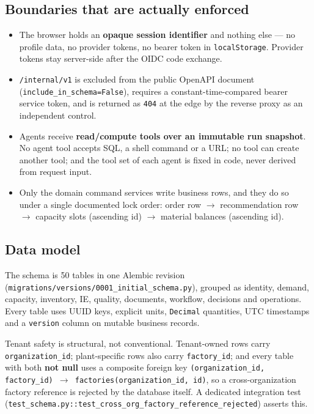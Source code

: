 \documentclass[11pt,a4paper]{article}
\begin{document}
\clearpage
\subsection{Boundaries that are actually enforced}

\begin{itemize}
\item The browser holds an \textbf{opaque session identifier} and nothing else
  --- no profile data, no provider tokens, no bearer token in
  \texttt{localStorage}. Provider tokens stay server-side after the OIDC code
  exchange.
\item \texttt{/internal/v1} is excluded from the public OpenAPI document
  (\texttt{include\_in\_schema=False}), requires a constant-time-compared bearer
  service token, and is returned as \texttt{404} at the edge by the reverse
  proxy as an independent control.
\item Agents receive \textbf{read/compute tools over an immutable run snapshot}.
  No agent tool accepts SQL, a shell command or a URL; no tool can create
  another tool; and the tool set of each agent is fixed in code, never derived
  from request input.
\item Only the domain command services write business rows, and they do so under
  a single documented lock order: order row $\rightarrow$ recommendation row
  $\rightarrow$ capacity slots (ascending id) $\rightarrow$ material balances
  (ascending id).
\end{itemize}

\subsection{Data model}

The schema is 50 tables in one Alembic revision
(\texttt{migrations/versions/0001\_initial\_schema.py}), grouped as identity,
demand, capacity, inventory, IE, quality, documents, workflow, decisions and
operations. Every table uses UUID keys, explicit units, \texttt{Decimal}
quantities, UTC timestamps and a \texttt{version} column on mutable business
records.

Tenant safety is structural, not conventional. Tenant-owned rows carry
\texttt{organization\_id}; plant-specific rows also carry \texttt{factory\_id};
and every table with both \textbf{not null} uses a composite foreign key
\texttt{(organization\_id, factory\_id) $\rightarrow$ factories(organization\_id,
id)}, so a cross-organization factory reference is rejected by the database
itself. A dedicated integration test
(\texttt{test\_schema.py::test\_cross\_org\_factory\_reference\_rejected})
asserts this.
\end{document}
